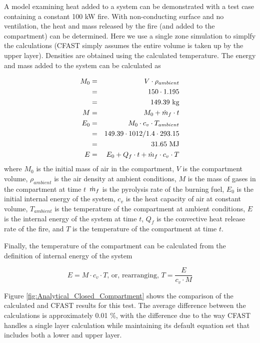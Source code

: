 A model examining heat added to a system can be demonstrated with a test case containing a constant 100 kW fire.  With non-conducting surface and no ventilation, the heat and mass released by the fire (and added to the compartment) can be determined.  Here we use a single zone simulation to simplfy the calculations (CFAST simply assumes the entire volume is taken up by the upper layer).  Densities are obtained using the calculated temperature. The energy and mass added to the system can be calculated as

\begin{eqnarray}
M_0 &=& V \cdot \rho_{ambient} \nonumber \\
 &=& 150 \cdot 1.195 \nonumber \\
 &=& 149.39 \text{\ kg} \nonumber \\
M &=& M_0 + \dot{m}_f \cdot t \\
E_0 &=& M_0 \cdot c_v \cdot T_{ambient} \nonumber \\
 &=& 149.39 \cdot 1012/1.4 \cdot 293.15 \nonumber \\
 &=& 31.65  \text{\ MJ} \nonumber \\
E &=& E_0 + Q_f \cdot t + \dot{m}_f \cdot c_v \cdot T
\end{eqnarray}
where $M_0$ is the initial mass of air in the compartment, $V$ is the compartment volume, $\rho_{ambient}$ is the air density at ambient conditions, $M$ is the mass of gases in the compartment at time $t$\, $\dot{m}_f$ is the pyrolysis rate of the burning fuel, $E_0$ is the initial internal energy of the system, $c_v$ is the heat capacity of air at constant volume, $T_{ambient}$ is the temperature of the compartment at ambient conditions, $E$ is the internal energy of the system at time $t$, $Q_f$ is the convective heat release rate of the fire, and $T$ is the temperature of the compartment at time $t$.

Finally, the temperature of the compartment can be calculated from the definition of internal energy of the system

\begin{equation}
E = M \cdot c_v \cdot T \text{, or, rearranging, } T = \frac{E}{c_v \cdot M}
\end{equation}

Figure \ref{fig:Analytical_Closed_Compartment} shows the comparison of the calculated and CFAST results for this test. The average difference between the calculations is approximately 0.01 \%, with the difference due to the way CFAST handles a single layer calculation while maintaining its default equation set that includes both a lower and upper layer.

